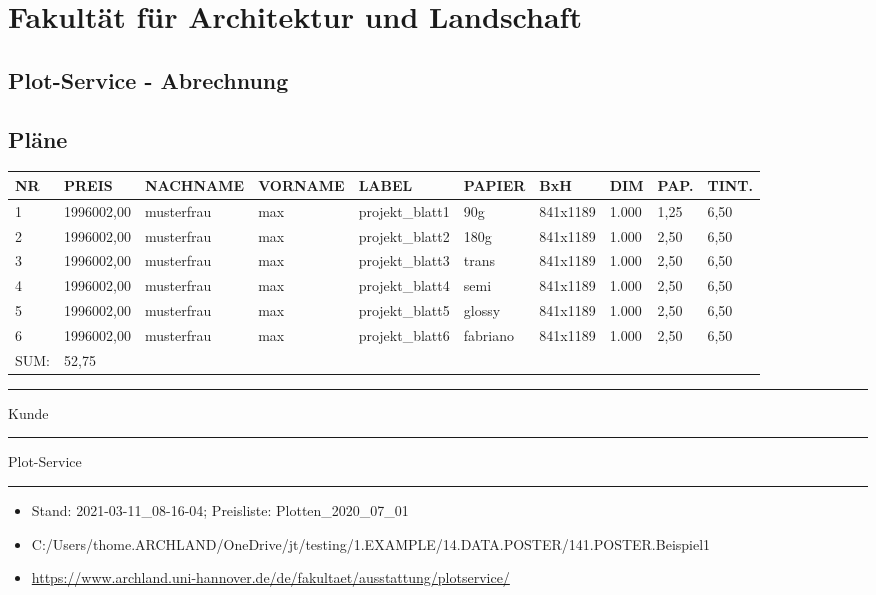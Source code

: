 \documentclass[
]{article}
\author{}
\date{}
\begin{document}
\hypertarget{fakultuxe4t-fuxfcr-architektur-und-landschaft}{%
\section{Fakultät für Architektur und
Landschaft}\label{fakultuxe4t-fuxfcr-architektur-und-landschaft}}

\hypertarget{plot-service---abrechnung}{%
\subsection{Plot-Service - Abrechnung}\label{plot-service---abrechnung}}

\hypertarget{pluxe4ne}{%
\subsection{Pläne}\label{pluxe4ne}}

\begin{longtable}[]{@{}llllllllll@{}}
\toprule
NR & PREIS & NACHNAME & VORNAME & LABEL & PAPIER & BxH & DIM & PAP. &
TINT. \\
\midrule
\endhead
1 & 1996002,00 & musterfrau & max & projekt\_blatt1 & 90g & 841x1189 &
1.000 & 1,25 & 6,50 \\
2 & 1996002,00 & musterfrau & max & projekt\_blatt2 & 180g & 841x1189 &
1.000 & 2,50 & 6,50 \\
3 & 1996002,00 & musterfrau & max & projekt\_blatt3 & trans & 841x1189 &
1.000 & 2,50 & 6,50 \\
4 & 1996002,00 & musterfrau & max & projekt\_blatt4 & semi & 841x1189 &
1.000 & 2,50 & 6,50 \\
5 & 1996002,00 & musterfrau & max & projekt\_blatt5 & glossy & 841x1189
& 1.000 & 2,50 & 6,50 \\
6 & 1996002,00 & musterfrau & max & projekt\_blatt6 & fabriano &
841x1189 & 1.000 & 2,50 & 6,50 \\
SUM: & 52,75 & & & & & & & & \\
\bottomrule
\end{longtable}

\begin{center}\rule{0.5\linewidth}{0.5pt}\end{center}

Kunde

\begin{center}\rule{0.5\linewidth}{0.5pt}\end{center}

Plot-Service

\begin{center}\rule{0.5\linewidth}{0.5pt}\end{center}

\begin{itemize}
\item
  Stand: 2021-03-11\_08-16-04; Preisliste: Plotten\_2020\_07\_01
\item
  C:/Users/thome.ARCHLAND/OneDrive/jt/testing/1.EXAMPLE/14.DATA.POSTER/141.POSTER.Beispiel1
\item
  \url{https://www.archland.uni-hannover.de/de/fakultaet/ausstattung/plotservice/}
\end{itemize}
\end{document}
